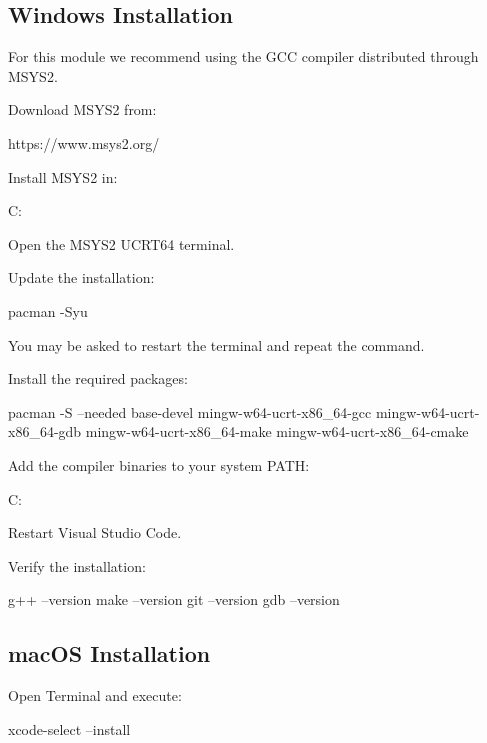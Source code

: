 \documentclass{csc2059practical}
\begin{document}
\subsection{Windows Installation}

For this module we recommend using the GCC compiler distributed through MSYS2.

Download MSYS2 from:

\begin{terminal}
https://www.msys2.org/
\end{terminal}

Install MSYS2 in:

\begin{terminal}
C:\Apps{}
\end{terminal}

Open the MSYS2 UCRT64 terminal.

Update the installation:

\begin{bashcode}
pacman -Syu
\end{bashcode}

You may be asked to restart the terminal and repeat the command.

Install the required packages:

\begin{bashcode}
pacman -S --needed base-devel mingw-w64-ucrt-x86_64-gcc mingw-w64-ucrt-x86_64-gdb mingw-w64-ucrt-x86_64-make mingw-w64-ucrt-x86_64-cmake
\end{bashcode}

Add the compiler binaries to your system PATH:

\begin{terminal}
C:\Apps{}\bin
\end{terminal}

Restart Visual Studio Code.

Verify the installation:

\begin{bashcode}
g++ --version
make --version
git --version
gdb --version
\end{bashcode}

\subsection{macOS Installation}

Open Terminal and execute:

\begin{bashcode}
xcode-select --install
\end{bashcode}
\end{document}
